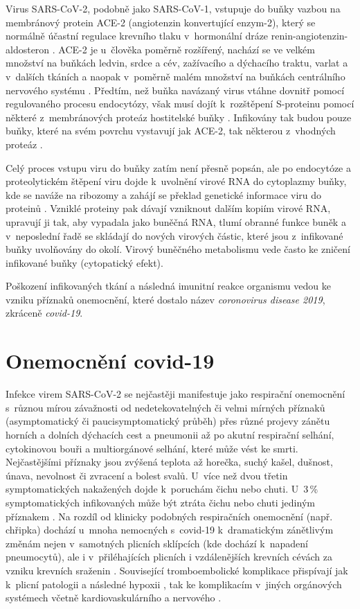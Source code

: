 Virus SARS-CoV-2, podobně jako SARS-CoV-1, vstupuje do buňky vazbou na membránový protein ACE-2 (angiotenzin konvertující enzym-2), který se normálně účastní regulace krevního tlaku v~hormonální dráze renin-angiotenzin-aldosteron \cite{Li:2017}. ACE-2 je u~člověka poměrně rozšířený, nachází se ve velkém množství na buňkách ledvin, srdce a cév, zažívacího a dýchacího traktu, varlat a v~dalších tkáních a naopak v~poměrně malém množství na buňkách centrálního nervového systému \cite{Harmer:2002}. Předtím, než buňka navázaný virus vtáhne dovnitř pomocí regulovaného procesu endocytózy, však musí dojít k~rozštěpení S-proteinu pomocí některé z~membránových proteáz hostitelské buňky \cite{Hoffmann:2020}. Infikovány tak budou pouze buňky, které na svém povrchu vystavují jak ACE-2, tak některou z~vhodných proteáz \cite{Murgolo:2021}.

Celý proces vstupu viru do buňky zatím není přesně popsán, ale po endocytóze a proteolytickém štěpení viru dojde k~uvolnění virové RNA do cytoplazmy buňky, kde se naváže na ribozomy a zahájí se překlad genetické informace viru do proteinů \cite{Khan:2020}. Vzniklé proteiny pak dávají vzniknout dalším kopiím virové RNA, upravují ji tak, aby vypadala jako buněčná RNA, tlumí obranné funkce buněk a v~neposlední řadě se skládají do nových virových částic, které jsou z~infikované buňky uvolňovány do okolí. Virový  buněčného metabolismu vede často ke zničení infikované buňky (cytopatický efekt).

Poškození infikovaných tkání a následná imunitní reakce organismu vedou ke vzniku příznaků onemocnění, které dostalo název \textit{coronovirus disease 2019}, zkráceně \textit{covid-19}.

\section*{Onemocnění covid-19}

Infekce virem SARS-CoV-2 se nejčastěji manifestuje jako respirační onemocnění s~různou mírou závažnosti od nedetekovatelných či velmi mírných příznaků (asymptomatický či paucisymptomatický průběh) přes různé projevy zánětu horních a dolních dýchacích cest a pneumonii až po akutní respirační selhání, cytokinovou bouři a multiorgánové selhání, které může vést ke smrti. Nejčastějšími příznaky jsou zvýšená teplota až horečka, suchý kašel, dušnost, únava, nevolnost či zvracení a bolest svalů. U~více než dvou třetin symptomatických nakažených dojde k~poruchám čichu nebo chuti. U~3\,\% symptomatických infikovaných může být ztráta čichu nebo chuti jediným příznakem \cite{Xie:2020,Wiersinga:2020}. Na rozdíl od klinicky podobných respiračních onemocnění (např. chřipka) dochází u~mnoha nemocných s~covid-19 k~dramatickým zánětlivým změnám nejen v~samotných plicních sklípcích (kde dochází k~napadení pneumocytů), ale i v~přiléhajících plicních i vzdálenějších krevních cévách za vzniku krevních sraženin \cite{Ackermann:2020}. Související tromboembolické komplikace přispívají jak k~plicní patologii a následné hypoxii \cite{McGonagle:2021}, tak ke komplikacím v~jiných orgánových systémech včetně kardiovaskulárního a nervového \cite{Gupta:2020}.

